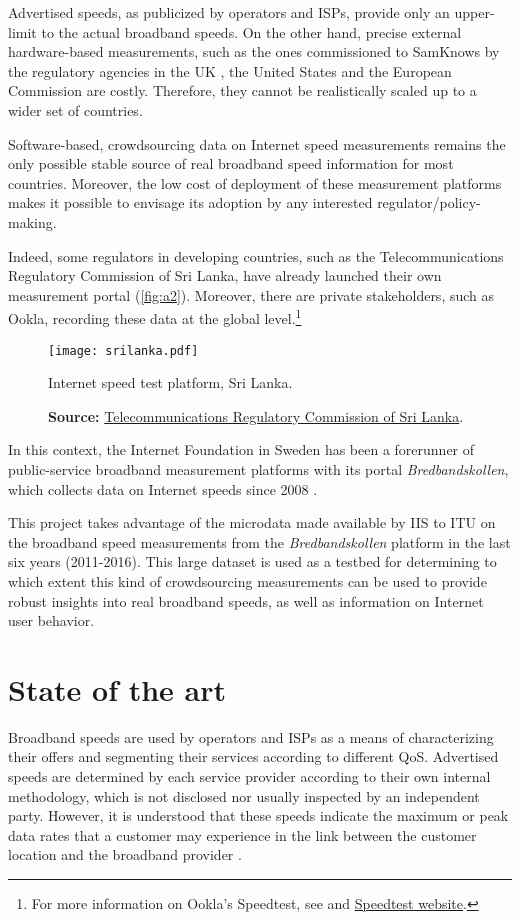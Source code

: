 \documentclass[12pt]{article}
\begin{document}
Advertised speeds, as publicized by operators and ISPs, provide only an upper-limit to the actual broadband speeds. On the other hand, precise external hardware-based measurements, such as the ones commissioned to SamKnows by the regulatory agencies in the UK \citep{ofcom2017}, the United States \citep{fcc2015b} and the European Commission \citep{samknows2013} are costly. Therefore, they cannot be realistically scaled up to a wider set of countries.  

Software-based, crowdsourcing data on Internet speed measurements remains the only possible stable source of real broadband speed information for most countries. Moreover, the low cost of deployment of these measurement platforms makes it possible to envisage its adoption by any interested regulator/policy-making. 

Indeed, some regulators in developing countries, such as the Telecommunications Regulatory Commission of Sri Lanka, have already launched their own measurement portal (\autoref{fig:a2}). Moreover, there are private stakeholders, such as Ookla, recording these data at the global level.\footnote{For more information on Ookla's Speedtest, see  and \href{http://beta.speedtest.net/about}{Speedtest website}.} 

\begin{figure}[H]
    \centering
        \texttt{[image: srilanka.pdf]}
        \caption{Internet speed test platform,  Sri Lanka.}
        \caption*{\textbf{Source:} \href{http://www.trc.gov.lk/2014-05-12-13-25-54/internet-speed-test.html}{Telecommunications Regulatory Commission of Sri Lanka}.}
        \label{fig:a2}
\end{figure}   

In this context, the Internet Foundation in Sweden has been a forerunner of public-service broadband measurement platforms with its portal \textit{Bredbandskollen}, which collects data on Internet speeds since 2008 \citep{bredbandskollen}.   

This project takes advantage of the microdata made available by IIS to ITU on the broadband speed measurements from the \textit{Bredbandskollen} platform in the last six years (2011-2016). This large dataset is used as a testbed for determining to which extent this kind of crowdsourcing measurements can be used to provide robust insights into real broadband speeds, as well as information on Internet user behavior.  

\section{State of the art}
Broadband speeds are used by operators and ISPs as a means of characterizing their offers and segmenting their services according to different QoS. Advertised speeds are determined by each service provider according to their own internal methodology, which is not disclosed nor usually inspected by an independent party. However, it is understood that these speeds indicate the maximum or peak data rates that a customer may experience in the link between the customer location and the broadband provider \citep{bauer2010}.
\end{document}
